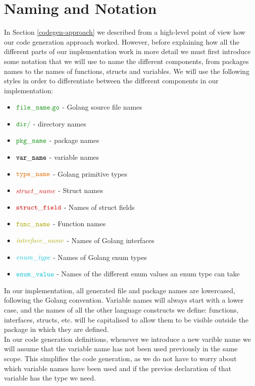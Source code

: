 \documentclass[12pt,twoside]{report}
\begin{document}
\section{Naming and Notation}\label{naming-and-notation}
In Section \ref{codegen-approach} we described from a high-level point of view how our code generation approach worked. However, before explaining how all the different parts of our implementation work in more detail we must first introduce some notation that we will use to name the different components, from packages names to the names of functions, structs and variables. We will use the following styles in order to differentiate between the different components in our implementation:

\begin{itemize}
    \item $\filename{file\_name}$ - Golang source file names
    \item $\dirname{dir}$ - directory names
    \item $\pkgname{pkg\_name}$ - package names
    \item ${\mathtt{var\_name}}$ - variable names
    \item $\typename{type\_name}$ - Golang primitive types
    \item $\structname{struct\_name}$ - Struct names
    \item $\structfield{struct\_field}$ - Names of struct fields
    \item $\functionname{func\_name}$ - Function names
    \item $\interfacename{interface\_name}$ - Names of Golang interfaces
    \item $\enumtype{enum\_type}$ - Names of Golang enum types
    \item $\enumvalue{enum\_value}$ - Names of the different enum values an enum type can take
\end{itemize}

In our implementation, all generated file and package names are lowercased, following the Golang convention. Variable names will always start with a lower case, and the names of all the other language constructs we define: functions, interfaces, structs, etc. will be capitalised to allow them to be visible outside the package in which they are defined.\\

In our code generation definitions, whenever we introduce a new varible name we will assume that the variable name has not been used previously in the same scope. This simplifies the code generation, as we do not have to worry about which variable names have been used and if the previos declaration of that variable has the type we need.\\
\end{document}
